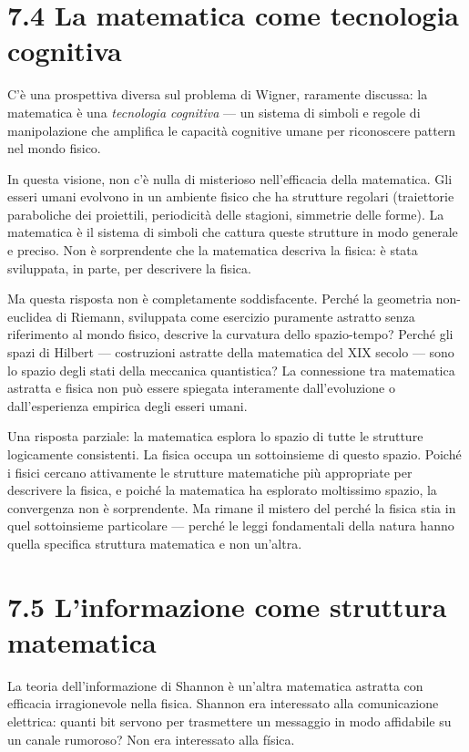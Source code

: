 \documentclass[11.5pt,a4paper,openany]{book}
\theoremstyle{remark}
\begin{document}
\section{7.4 La matematica come tecnologia cognitiva}

C'è una prospettiva diversa sul problema di Wigner, raramente discussa: la matematica è una \textit{tecnologia cognitiva} --- un sistema di simboli e regole di manipolazione che amplifica le capacità cognitive umane per riconoscere pattern nel mondo fisico.

In questa visione, non c'è nulla di misterioso nell'efficacia della matematica. Gli esseri umani evolvono in un ambiente fisico che ha strutture regolari (traiettorie paraboliche dei proiettili, periodicità delle stagioni, simmetrie delle forme). La matematica è il sistema di simboli che cattura queste strutture in modo generale e preciso. Non è sorprendente che la matematica descriva la fisica: è stata sviluppata, in parte, per descrivere la fisica.

Ma questa risposta non è completamente soddisfacente. Perché la geometria non-euclidea di Riemann, sviluppata come esercizio puramente astratto senza riferimento al mondo fisico, descrive la curvatura dello spazio-tempo? Perché gli spazi di Hilbert --- costruzioni astratte della matematica del XIX secolo --- sono lo spazio degli stati della meccanica quantistica? La connessione tra matematica astratta e fisica non può essere spiegata interamente dall'evoluzione o dall'esperienza empirica degli esseri umani.

Una risposta parziale: la matematica esplora lo spazio di tutte le strutture logicamente consistenti. La fisica occupa un sottoinsieme di questo spazio. Poiché i fisici cercano attivamente le strutture matematiche più appropriate per descrivere la fisica, e poiché la matematica ha esplorato moltissimo spazio, la convergenza non è sorprendente. Ma rimane il mistero del perché la fisica stia in quel sottoinsieme particolare --- perché le leggi fondamentali della natura hanno quella specifica struttura matematica e non un'altra.

\section{7.5 L'informazione come struttura matematica}

La teoria dell'informazione di Shannon è un'altra matematica astratta con efficacia irragionevole nella fisica. Shannon era interessato alla comunicazione elettrica: quanti bit servono per trasmettere un messaggio in modo affidabile su un canale rumoroso? Non era interessato alla física.
\end{document}
